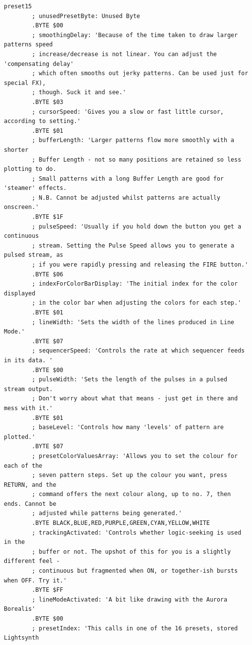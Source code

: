 \begin{lstlisting}[basicstyle=\ttfamily\tiny,caption=Source code for Preset 15.]
preset15
        ; unusedPresetByte: Unused Byte
        .BYTE $00
        ; smoothingDelay: 'Because of the time taken to draw larger patterns speed
        ; increase/decrease is not linear. You can adjust the 'compensating delay'
        ; which often smooths out jerky patterns. Can be used just for special FX),
        ; though. Suck it and see.'
        .BYTE $03
        ; cursorSpeed: 'Gives you a slow or fast little cursor, according to setting.'
        .BYTE $01
        ; bufferLength: 'Larger patterns flow more smoothly with a shorter
        ; Buffer Length - not so many positions are retained so less plotting to do.
        ; Small patterns with a long Buffer Length are good for 'steamer' effects.
        ; N.B. Cannot be adjusted whilst patterns are actually onscreen.'
        .BYTE $1F
        ; pulseSpeed: 'Usually if you hold down the button you get a continuous
        ; stream. Setting the Pulse Speed allows you to generate a pulsed stream, as
        ; if you were rapidly pressing and releasing the FIRE button.'
        .BYTE $06
        ; indexForColorBarDisplay: 'The initial index for the color displayed
        ; in the color bar when adjusting the colors for each step.'
        .BYTE $01
        ; lineWidth: 'Sets the width of the lines produced in Line Mode.'
        .BYTE $07
        ; sequencerSpeed: 'Controls the rate at which sequencer feeds in its data. '
        .BYTE $00
        ; pulseWidth: 'Sets the length of the pulses in a pulsed stream output.
        ; Don't worry about what that means - just get in there and mess with it.'
        .BYTE $01
        ; baseLevel: 'Controls how many 'levels' of pattern are plotted.'
        .BYTE $07
        ; presetColorValuesArray: 'Allows you to set the colour for each of the
        ; seven pattern steps. Set up the colour you want, press RETURN, and the
        ; command offers the next colour along, up to no. 7, then ends. Cannot be
        ; adjusted while patterns being generated.'
        .BYTE BLACK,BLUE,RED,PURPLE,GREEN,CYAN,YELLOW,WHITE
        ; trackingActivated: 'Controls whether logic-seeking is used in the
        ; buffer or not. The upshot of this for you is a slightly different feel -
        ; continuous but fragmented when ON, or together-ish bursts when OFF. Try it.'
        .BYTE $FF
        ; lineModeActivated: 'A bit like drawing with the Aurora Borealis'
        .BYTE $00
        ; presetIndex: 'This calls in one of the 16 presets, stored Lightsynth

\end{lstlisting}
